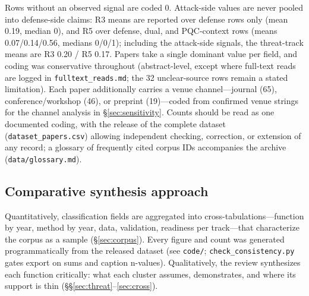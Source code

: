 \documentclass[11pt,a4paper]{article}
\begin{document}
Rows without an observed signal are coded 0. Attack-side values are never pooled into defense-side claims: R3 means are reported over defense rows only (mean 0.19, median 0), and R5 over defense, dual, and PQC-context rows (means 0.07/0.14/0.56, medians 0/0/1); including the attack-side signals, the threat-track means are R3 0.20 / R5 0.17. Papers take a single dominant value per field, and coding was conservative throughout (abstract-level, except where full-text reads are logged in \texttt{fulltext\_reads.md}; the 32 unclear-source rows remain a stated limitation). Each paper additionally carries a venue channel---journal (65), conference/workshop (46), or preprint (19)---coded from confirmed venue strings for the channel analysis in \S\ref{sec:sensitivity}. Counts should be read as one documented coding, with the release of the complete dataset (\texttt{dataset\_papers.csv}) allowing independent checking, correction, or extension of any record; a glossary of frequently cited corpus IDs accompanies the archive (\texttt{data/glossary.md}).

\subsection{Comparative synthesis approach}
Quantitatively, classification fields are aggregated into cross-tabulations---function by year, method by year, data, validation, readiness per track---that characterize the corpus as a sample (\S\ref{sec:corpus}). Every figure and count was generated programmatically from the released dataset (see \texttt{code/}; \texttt{check\_consistency.py} gates export on sums and caption n-values). Qualitatively, the review synthesizes each function critically: what each cluster assumes, demonstrates, and where its support is thin (\S\S\ref{sec:threat}--\ref{sec:cross}).
\end{document}

